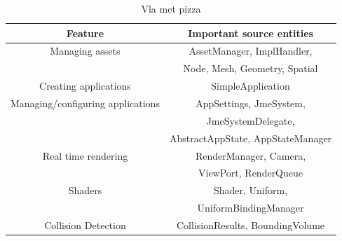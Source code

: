 \documentclass[a4paper, 10pt]{article}
\begin{document}
\begin{table}
  \caption{Vla met pizza}
\begin{tabular}{| c | c |}
  \hline
  \textbf{Feature}                  & \textbf{Important source entities} \\
  \hline
  \hline
  Managing assets                   & AssetManager, ImplHandler, \\
				    & Node, Mesh, Geometry, Spatial \\
  \hline
  Creating applications             & SimpleApplication \\
  \hline
  Managing/configuring applications & AppSettings, JmeSystem, \\
                                    & JmeSystemDelegate, \\
                                    & AbstractAppState, AppStateManager \\
  \hline
  Real time rendering               & RenderManager, Camera,  \\
                                    & ViewPort, RenderQueue \\
  \hline
  Shaders                           & Shader, Uniform, \\
                                    & UniformBindingManager \\
  \hline
  Collision Detection		    & CollisionResults, BoundingVolume\\
  \hline
\end{tabular}

\end{table}
\end{document}
